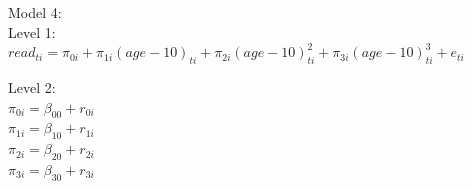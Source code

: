 \documentclass[]{article}
\newenvironment{Shaded}{\begin{snugshade}}{\end{snugshade}}
\newcommand{\KeywordTok}[1]{\textcolor[rgb]{0.13,0.29,0.53}{\textbf{#1}}}
\newcommand{\DataTypeTok}[1]{\textcolor[rgb]{0.13,0.29,0.53}{#1}}
\newcommand{\DecValTok}[1]{\textcolor[rgb]{0.00,0.00,0.81}{#1}}
\newcommand{\StringTok}[1]{\textcolor[rgb]{0.31,0.60,0.02}{#1}}
\newcommand{\OperatorTok}[1]{\textcolor[rgb]{0.81,0.36,0.00}{\textbf{#1}}}
\newcommand{\NormalTok}[1]{#1}
\begin{document}
Model 4:\\
Level 1:\\
\(read_{ti} = \pi_{0i} + \pi_{1i}(age-10)_{ti} + \pi_{2i}(age-10)^2_{ti} + \pi_{3i}(age-10)^3_{ti} + e_{ti}\)

Level 2:\\
\(\pi_{0i} = \beta_{00} + r_{0i}\)\\
\(\pi_{1i} = \beta_{10} + r_{1i}\)\\
\(\pi_{2i} = \beta_{20} + r_{2i}\)\\
\(\pi_{3i} = \beta_{30} + r_{3i}\)

\begin{Shaded}
\end{Shaded}
\end{document}
